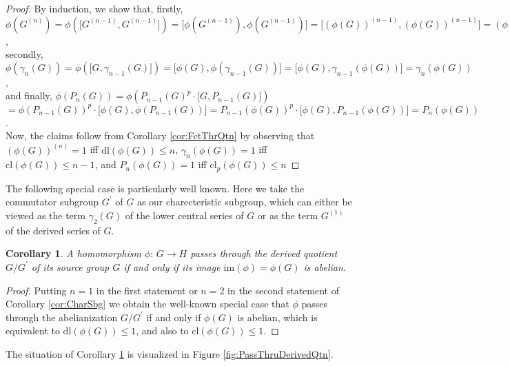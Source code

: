 \documentclass{amsart}
\newtheorem{corollary}{Corollary}[section]
\theoremstyle{definition}
\numberwithin{equation}{section}
\begin{document}
\begin{proof}
By induction, we show that, firstly,\\
\(\phi(G^{(n)})=\phi(\lbrack G^{(n-1)},G^{(n-1)}\rbrack)=\lbrack \phi(G^{(n-1)}),\phi(G^{(n-1)})\rbrack
=\lbrack (\phi(G))^{(n-1)},(\phi(G))^{(n-1)}\rbrack=(\phi(G))^{(n)}\),\\
secondly,
\(\phi(\gamma_n(G))=\phi(\lbrack G,\gamma_{n-1}(G)\rbrack)=\lbrack \phi(G),\phi(\gamma_{n-1}(G))\rbrack
=\lbrack \phi(G),\gamma_{n-1}(\phi(G))\rbrack=\gamma_n(\phi(G))\),\\
and finally,
\(\phi(P_n(G))=\phi(P_{n-1}(G)^p\cdot\lbrack G,P_{n-1}(G)\rbrack)\)\\
\(=\phi(P_{n-1}(G))^p\cdot\lbrack \phi(G),\phi(P_{n-1}(G))\rbrack
=P_{n-1}(\phi(G))^p\cdot\lbrack \phi(G),P_{n-1}(\phi(G))\rbrack=P_n(\phi(G))\).\\
Now, the claims follow from Corollary
\ref{cor:FctThrQtn}
by observing that
\((\phi(G))^{(n)}=1\) iff \(\mathrm{dl}(\phi(G))\le n\),
\(\gamma_n(\phi(G))=1\) iff \(\mathrm{cl}(\phi(G))\le n-1\), and
\(P_n(\phi(G))=1\) iff \(\mathrm{cl}_p(\phi(G))\le n\)
\end{proof}


\noindent
The following special case is particularly well known.
Here we take the commutator subgroup \(G^\prime\) of \(G\) as our charecteristic subgroup,
which can either be viewed as the term \(\gamma_2(G)\) of the lower central series of \(G\)
or as the term \(G^{(1)}\) of the derived series of \(G\).


\begin{corollary}
\label{cor:Abelianization}
A homomorphism \(\phi:\,G\to H\) passes through the derived quotient \(G/G^\prime\) of its source group \(G\)
if and only if its image \(\mathrm{im}(\phi)=\phi(G)\) is abelian.
\end{corollary}


\begin{proof}
Putting \(n=1\) in the first statement
or \(n=2\) in the second statement
of Corollary
\ref{cor:CharSbg}
we obtain the well-known special case that
\(\phi\) passes through the abelianization \(G/G^\prime\) if and only if \(\phi(G)\) is abelian,
which is equivalent to \(\mathrm{dl}(\phi(G))\le 1\), and also to \(\mathrm{cl}(\phi(G))\le 1\).
\end{proof}


\noindent
The situation of Corollary
\ref{cor:Abelianization}
is visualized in Figure
\ref{fig:PassThruDerivedQtn}.
\end{document}
